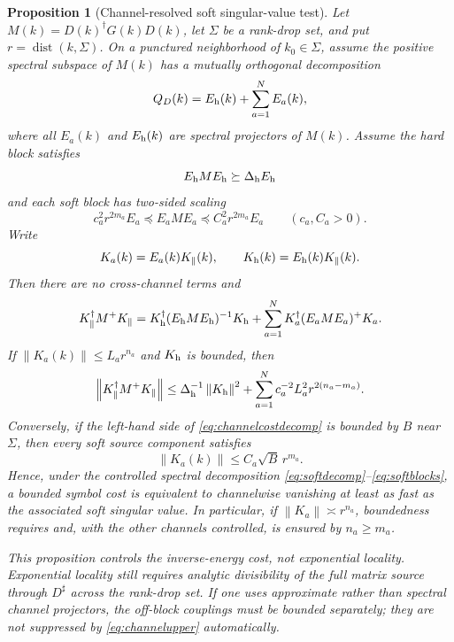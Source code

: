 \documentclass[11pt]{article}
\newtheorem{proposition}[theorem]{Proposition}
\theoremstyle{definition}
\theoremstyle{remark}
\newcommand{\dist}{\operatorname{dist}}
\newcommand{\norm}[1]{\left\lVert #1\right\rVert}
\begin{document}
\begin{proposition}[Channel-resolved soft singular-value test]
\label{prop:vanishingorder}
Let $M(k)=D(k)^\dagger G(k)D(k)$, let $\Sigma$ be a rank-drop set, and put $r=\dist(k,\Sigma)$.  On a punctured neighborhood of $k_0\in\Sigma$, assume the positive spectral subspace of $M(k)$ has a mutually orthogonal decomposition
\begin{equation}
 Q_D(k)=E_{\rm h}(k)+\sum_{a=1}^NE_a(k),
 \label{eq:softdecomp}
\end{equation}
where all $E_a(k)$ and $E_{\rm h}(k)$ are spectral projectors of $M(k)$.  Assume the hard block satisfies
\[
 E_{\rm h}ME_{\rm h}\succeq \Delta_{\rm h}E_{\rm h}
\]
and each soft block has two-sided scaling
\begin{equation}
 c_a^2r^{2m_a}E_a
 \preceq E_aME_a
 \preceq C_a^2r^{2m_a}E_a
 \qquad (c_a,C_a>0).
 \label{eq:softblocks}
\end{equation}
Write
\begin{equation}
 K_a(k)=E_a(k)K_\parallel(k),
 \qquad
 K_{\rm h}(k)=E_{\rm h}(k)K_\parallel(k).
 \label{eq:projectedsourcechannels}
\end{equation}
Then there are no cross-channel terms and
\begin{equation}
 K_\parallel^\dagger M^+K_\parallel
 =K_{\rm h}^\dagger(E_{\rm h}ME_{\rm h})^{-1}K_{\rm h}
 +\sum_{a=1}^N
 K_a^\dagger(E_aME_a)^+K_a.
 \label{eq:channelcostdecomp}
\end{equation}
If $\norm{K_a(k)}\le L_ar^{n_a}$ and $K_{\rm h}$ is bounded, then
\begin{equation}
 \norm{K_\parallel^\dagger M^+K_\parallel}
 \le \Delta_{\rm h}^{-1}\norm{K_{\rm h}}^2
 +\sum_{a=1}^N c_a^{-2}L_a^2r^{2(n_a-m_a)}.
 \label{eq:channelupper}
\end{equation}
Conversely, if the left-hand side of \eqref{eq:channelcostdecomp} is bounded by $B$ near $\Sigma$, then every soft source component satisfies
\begin{equation}
 \boxed{\norm{K_a(k)}\le C_a\sqrt{B}\,r^{m_a}.}
 \label{eq:channelnecessary}
\end{equation}
Hence, under the controlled spectral decomposition \eqref{eq:softdecomp}--\eqref{eq:softblocks}, a bounded symbol cost is equivalent to channelwise vanishing at least as fast as the associated soft singular value.  In particular, if $\norm{K_a}\asymp r^{n_a}$, boundedness requires and, with the other channels controlled, is ensured by $n_a\ge m_a$.

This proposition controls the inverse-energy cost, not exponential locality.  Exponential locality still requires analytic divisibility of the full matrix source through $D^\sharp$ across the rank-drop set.  If one uses approximate rather than spectral channel projectors, the off-block couplings must be bounded separately; they are not suppressed by \eqref{eq:channelupper} automatically.
\end{proposition}
\end{document}
